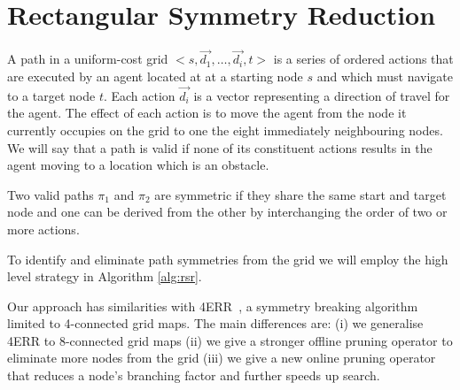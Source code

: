\section{Rectangular Symmetry Reduction}
\label{sec:rsr}
A path in a uniform-cost grid 
$< s, \vec{d_1}, \ldots, \vec{d_i}, t >$ 
is a series of ordered actions that are executed by an agent located at 
at a starting node $s$ and which must navigate to a target node $t$.
Each action $\vec{d_i}$ is a vector representing a direction of travel for
the agent. The effect of each action is to move the agent from the node it currently
occupies on the grid to one the eight immediately neighbouring nodes.
We will say that a path is valid if none of its constituent actions results
in the agent moving to a location which is an obstacle.

\begin{definition}
\label{def:symmetry}
Two valid paths $\pi_{1}$ and $\pi_{2}$ are symmetric if they share the same start and
target node and one can be derived from the other by interchanging the order of
two or more actions.
\end{definition}

To identify and eliminate path symmetries from the grid we will employ the high 
level strategy in Algorithm \ref{alg:rsr}.



Our approach has similarities with 4ERR~\cite{harabor10}, a symmetry breaking algorithm 
limited to 4-connected grid maps.
The main differences are: (i) we generalise 4ERR to 8-connected grid maps 
(ii) we give a stronger offline pruning operator to eliminate more nodes from
the grid (iii) we give a new online pruning operator that reduces a node's branching
factor and further speeds up search.
